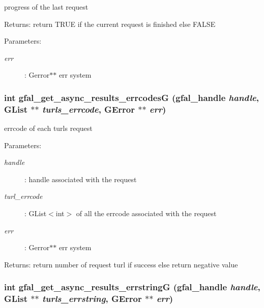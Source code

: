 progress of the last request 

\begin{Desc}
\item[Returns:]return TRUE if the current request is finished else FALSE \end{Desc}
\begin{Desc}
\item[Parameters:]
\begin{description}
\item[{\em err}]: Gerror$\ast$$\ast$ err system \end{description}
\end{Desc}
\subsubsection{\setlength{\rightskip}{0pt plus 5cm}int gfal\_\-get\_\-async\_\-results\_\-errcodes\-G (gfal\_\-handle {\em handle}, GList $\ast$$\ast$ {\em turls\_\-errcode}, GError $\ast$$\ast$ {\em err})}\label{gfal__common__srm_8h_0d1a5a270a56e0123960a0087bc33c08}


errcode of each turls request 

\begin{Desc}
\item[Parameters:]
\begin{description}
\item[{\em handle}]: handle associated with the request \item[{\em turl\_\-errcode}]: GList$<$int$>$ of all the errcode associated with the request \item[{\em err}]: Gerror$\ast$$\ast$ err system \end{description}
\end{Desc}
\begin{Desc}
\item[Returns:]return number of request turl if success else return negative value \end{Desc}
\subsubsection{\setlength{\rightskip}{0pt plus 5cm}int gfal\_\-get\_\-async\_\-results\_\-errstring\-G (gfal\_\-handle {\em handle}, GList $\ast$$\ast$ {\em turls\_\-errstring}, GError $\ast$$\ast$ {\em err})}\label{gfal__common__srm_8h_089643e4b8996a1e8896009f266ccdf0}


